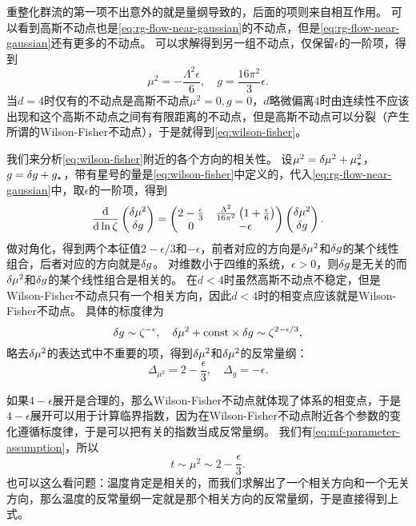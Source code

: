 \documentclass[hyperref, UTF8, a4paper]{ctexart}
\newcommand*{\const}{\mathrm{const}}
\begin{document}
重整化群流的第一项不出意外的就是量纲导致的，后面的项则来自相互作用。
可以看到高斯不动点也是\eqref{eq:rg-flow-near-gaussian}的不动点，但是\eqref{eq:rg-flow-near-gaussian}还有更多的不动点。
可以求解得到另一组不动点，仅保留$\epsilon$的一阶项，得到
\begin{equation}
    \mu^2 = - \frac{\Lambda^2 \epsilon}{6}, \quad g = \frac{16 \pi^2}{3} \epsilon.
    \label{eq:wilson-fisher}
\end{equation}
当$d=4$时仅有的不动点是高斯不动点$\mu^2=0, g=0$，$d$略微偏离$4$时由连续性不应该出现和这个高斯不动点之间有有限距离的不动点，但是高斯不动点可以分裂（产生所谓的Wilson-Fisher不动点），于是就得到\eqref{eq:wilson-fisher}。

我们来分析\eqref{eq:wilson-fisher}附近的各个方向的相关性。
设$\mu^2 = \var{\mu^2} + \mu_\star^2$，$g = \var{g} + g_\star$，带有星号的量是\eqref{eq:wilson-fisher}中定义的，代入\eqref{eq:rg-flow-near-gaussian}中，取$\epsilon$的一阶项，得到
\[
    \dv{\ln \zeta} \pmqty{\var{\mu^2} \\ \var{g}} = \pmqty{ 2 - \frac{\epsilon}{3} & \frac{\Lambda^2}{16 \pi^2} \left( 1 + \frac{\epsilon}{6} \right) \\ 0 & - \epsilon } \pmqty{\var{\mu^2} \\ \var{g}}.
\]
做对角化，得到两个本征值$2-\epsilon/3$和$-\epsilon$，前者对应的方向是$\var{\mu^2}$和$\var{g}$的某个线性组合，后者对应的方向就是$\var{g}$。
对维数小于四维的系统，$\epsilon>0$，则$\var{g}$是无关的而$\var{\mu^2}$和$\var{g}$的某个线性组合是相关的。
在$d<4$时虽然高斯不动点不稳定，但是Wilson-Fisher不动点只有一个相关方向，因此$d<4$时的相变点应该就是Wilson-Fisher不动点。
具体的标度律为
\[
    \var{g} \sim \zeta^{-\epsilon}, \quad \var{\mu^2} + \const \times \var{g} \sim \zeta^{2 - \epsilon/3},
\]
略去$\var{\mu^2}$的表达式中不重要的项，得到$\var{\mu^2}$和$\var{\mu^2}$的反常量纲：
\begin{equation}
    \Delta_{\mu^2} = 2 - \frac{\epsilon}{3}, \quad \Delta_g = - \epsilon.
\end{equation}

如果$4-\epsilon$展开是合理的，那么Wilson-Fisher不动点就体现了体系的相变点，于是$4-\epsilon$展开可以用于计算临界指数，因为在Wilson-Fisher不动点附近各个参数的变化遵循标度律，于是可以把有关的指数当成反常量纲。
我们有\eqref{eq:mf-parameter-assumption}，所以
\begin{equation}
    t \sim \mu^2 \sim 2 - \frac{\epsilon}{3}.
\end{equation}
也可以这么看问题：温度肯定是相关的，而我们求解出了一个相关方向和一个无关方向，那么温度的反常量纲一定就是那个相关方向的反常量纲，于是直接得到上式。
\end{document}
